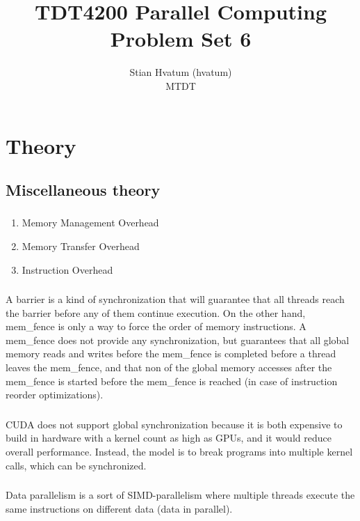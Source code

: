 \documentclass[english,a4paper,numbers=noenddot]{article}
\title{TDT4200 Parallel Computing\\
\Huge Problem Set 6}
\author{Stian Hvatum (hvatum)\\MTDT}
\begin{document}
\maketitle
\tableofcontents
\section{Theory}
\subsection{Miscellaneous theory}
\subsubsection{}
\begin{enumerate}
\item Memory Management Overhead
\item Memory Transfer Overhead
\item Instruction Overhead
\end{enumerate}

\subsubsection{}
A barrier is a kind of synchronization that will guarantee that all threads reach the barrier before any of them continue execution. On the other hand, mem\_fence is only a way to force the order of memory instructions. A mem\_fence does not provide any synchronization, but guarantees that all global memory reads and writes before the mem\_fence is completed before a thread leaves the mem\_fence, and that non of the global memory accesses after the mem\_fence is started before the mem\_fence is reached (in case of instruction reorder optimizations).

\subsubsection{}
CUDA does not support global synchronization because it is both expensive to build in hardware with a kernel count as high as GPUs, and it would reduce overall performance. Instead, the model is to break programs into multiple kernel calls, which can be synchronized.

\subsubsection{}
Data parallelism is a sort of SIMD-parallelism where multiple threads execute the same instructions on different data (data in parallel).
\end{document}
